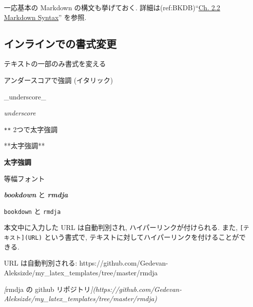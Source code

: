 \documentclass[
  nomag]{bxjsbook}
\newenvironment{Shaded}{\begin{snugshade}}{\end{snugshade}}
\newcommand{\CommentTok}[1]{\textcolor[rgb]{0.56,0.35,0.01}{\textit{#1}}}
\newcommand{\InformationTok}[1]{\textcolor[rgb]{0.56,0.35,0.01}{\textbf{\textit{#1}}}}
\newcommand{\NormalTok}[1]{#1}
\newcommand{\OtherTok}[1]{\textcolor[rgb]{0.56,0.35,0.01}{#1}}
\theoremstyle{definition}
\theoremstyle{definition}
\theoremstyle{definition}
\theoremstyle{remark}
\begin{document}
一応基本の Markdown の構文も挙げておく.
詳細は(ref:BKDB)``\href{https://bookdown.org/yihui/bookdown/markdown-syntax.html}{Ch.
2.2 Markdown Syntax}'' を参照.

\hypertarget{ux30a4ux30f3ux30e9ux30a4ux30f3ux3067ux306eux66f8ux5f0fux5909ux66f4}{%
\subsection{インラインでの書式変更}\label{ux30a4ux30f3ux30e9ux30a4ux30f3ux3067ux306eux66f8ux5f0fux5909ux66f4}}

テキストの一部のみ書式を変える

アンダースコアで強調 (イタリック)

\begin{Shaded}
\begin{Highlighting}[]
\NormalTok{\_underscore\_}
\end{Highlighting}
\end{Shaded}

\emph{underscore}

\texttt{**} 2つで太字強調

\begin{Shaded}
\begin{Highlighting}[]
\NormalTok{**太字強調**}
\end{Highlighting}
\end{Shaded}

\textbf{太字強調}

等幅フォント

\begin{Shaded}
\begin{Highlighting}[]
\InformationTok{\textasciigrave{}bookdown\textasciigrave{}}\NormalTok{ と }\InformationTok{\textasciigrave{}rmdja\textasciigrave{}}
\end{Highlighting}
\end{Shaded}

\texttt{bookdown} と \texttt{rmdja}

本文中に入力した URL は自動判別され, ハイパーリンクが付けられる. また,
\texttt{{[}テキスト{]}(URL)} という書式で,
テキストに対してハイパーリンクを付けることができる.

\begin{Shaded}
\begin{Highlighting}[]

\NormalTok{URL は自動判別される: https://github.com/Gedevan{-}Aleksizde/my\_latex\_templates/tree/master/rmdja}

\CommentTok{[}\OtherTok{\textasciigrave{}rmdja\textasciigrave{} の github リポジトリ}\CommentTok{](https://github.com/Gedevan{-}Aleksizde/my\_latex\_templates/tree/master/rmdja)}
\end{Highlighting}
\end{Shaded}
\end{document}
